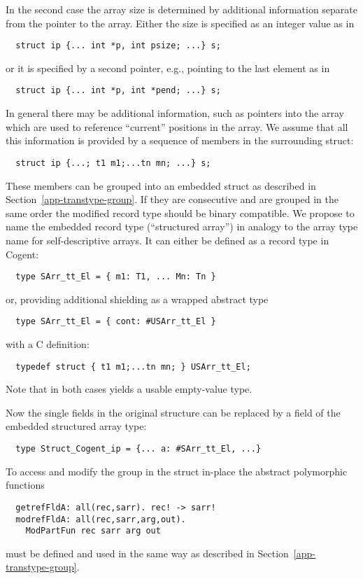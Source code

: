 In the second case the array size is determined by additional information separate from the pointer to the array.
Either the size is specified as an integer value as in 
\begin{verbatim}
  struct ip {... int *p, int psize; ...} s;
\end{verbatim}
or it is specified by a second pointer, e.g., pointing to the last element as in
\begin{verbatim}
  struct ip {... int *p, int *pend; ...} s;
\end{verbatim}
In general there may be additional information, such as pointers into the array which are used to reference
``current'' positions in the array. We assume that all this information is provided by a sequence of members
in the surrounding struct:
\begin{verbatim}
  struct ip {...; t1 m1;...tn mn; ...} s;
\end{verbatim}

These members can be grouped into an embedded struct as described in Section~\ref{app-transtype-group}. If they
are consecutive and are grouped in the same order the modified record type should be binary compatible.
We propose to name the embedded record type  (``structured array'') in analogy to the
array type name for self-descriptive arrays. It can either be defined as a record type in Cogent:
\begin{verbatim}
  type SArr_tt_El = { m1: T1, ... Mn: Tn }
\end{verbatim}
or, providing additional shielding as a wrapped abstract type 
\begin{verbatim}
  type SArr_tt_El = { cont: #USArr_tt_El }
\end{verbatim}
with a C definition:
\begin{verbatim}
  typedef struct { t1 m1;...tn mn; } USArr_tt_El;
\end{verbatim}
Note that in both cases  yields a usable empty-value type.

Now the single fields in the original structure can be replaced by a field of the embedded structured array type:
\begin{verbatim}
  type Struct_Cogent_ip = {... a: #SArr_tt_El, ...}
\end{verbatim}

To access and modify the group in the struct in-place the abstract polymorphic functions
\begin{verbatim}
  getrefFldA: all(rec,sarr). rec! -> sarr!
  modrefFldA: all(rec,sarr,arg,out). 
    ModPartFun rec sarr arg out 
\end{verbatim}
must be defined and used in the same way as described in Section~\ref{app-transtype-group}.

